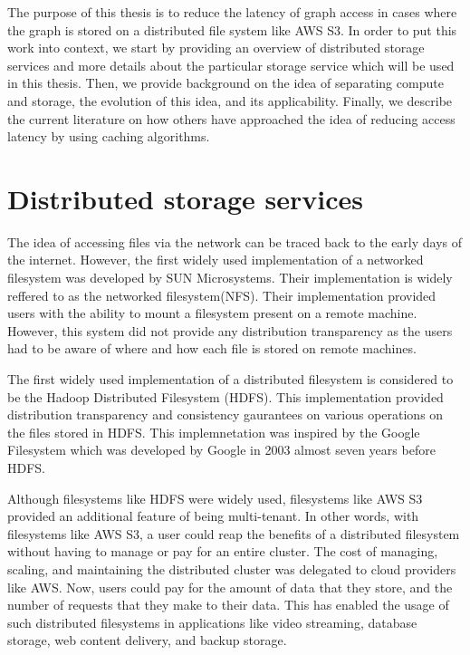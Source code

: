 The purpose of this thesis is to reduce the latency of graph access in cases
where the graph is stored on a distributed file system like AWS S3. In order to
put this work into context, we start by providing an overview of distributed
storage services and more details about the particular storage service which
will be used in this thesis. Then, we provide background on the idea of
separating compute and storage, the evolution of this idea, and its
applicability. Finally, we describe the current literature on how others have
approached the idea of reducing access latency by using caching algorithms.

\section{Distributed storage services}\label{sec:distributedStorage}
The idea of accessing files via the network can be traced back to the early days
of the internet. However, the first widely used implementation of a networked
filesystem was developed by SUN Microsystems\cite{nfs1986}. Their implementation
is widely reffered to as the networked filesystem(NFS). Their implementation
provided users with the ability to mount a filesystem present on a remote
machine. However, this system did not provide any distribution transparency as
the users had to be aware of where and how each file is stored on remote
machines. 

\medskip
The first widely used implementation of a distributed filesystem is considered
to be the Hadoop Distributed Filesystem (HDFS)\cite{shvachko2010hadoop}. This
implementation provided distribution transparency and consistency gaurantees on
various operations on the files stored in HDFS. This implemnetation was inspired
by the Google Filesystem\cite{ghemawat2003google} which was developed by Google
in 2003 almost seven years before HDFS.

\medskip
Although filesystems like HDFS were widely used, filesystems like AWS
S3\cite{awsS3} provided an additional feature of being multi-tenant. In other
words, with filesystems like AWS S3, a user could reap the benefits of a
distributed filesystem without having to manage or pay for an entire cluster.
The cost of managing, scaling, and maintaining the distributed cluster was
delegated to cloud providers like AWS. Now, users could pay for the amount of
data that they store, and the number of requests that they make to their data.
This has enabled the usage of such distributed filesystems in applications like
video streaming, database storage\cite{snowflake}, web content 
delivery, and backup storage.

